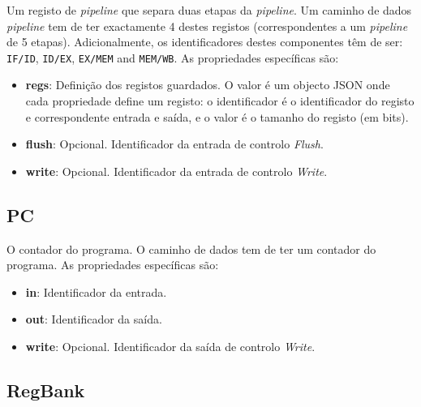 \documentclass[11pt,a4paper,twoside,titlepage]{report}
\begin{document}
Um registo de \emph{pipeline} que separa duas etapas da \emph{pipeline}.
Um caminho de dados \emph{pipeline} tem de ter exactamente 4 destes registos
(correspondentes a um \emph{pipeline} de 5 etapas). Adicionalmente, os
identificadores destes componentes têm de ser:
\verb+IF/ID+, \verb+ID/EX+, \verb+EX/MEM+ and \verb+MEM/WB+.
As propriedades específicas são:
\begin{itemize}
	\item \textbf{regs}: Definição dos registos guardados. O valor é um objecto
		JSON onde cada propriedade define um registo: o identificador é o
		identificador do registo e correspondente entrada e saída, e o valor é o
		tamanho do registo (em bits).
	\item \textbf{flush}: Opcional. Identificador da entrada de controlo \emph{Flush}.
	\item \textbf{write}: Opcional. Identificador da entrada de controlo \emph{Write}.
\end{itemize}

\subsection{PC}

O contador do programa. O caminho de dados tem de ter um contador do programa.
As propriedades específicas são:
\begin{itemize}
	\item \textbf{in}: Identificador da entrada.
	\item \textbf{out}: Identificador da saída.
	\item \textbf{write}: Opcional. Identificador da saída de controlo \emph{Write}.
\end{itemize}

\subsection{RegBank}
\end{document}
